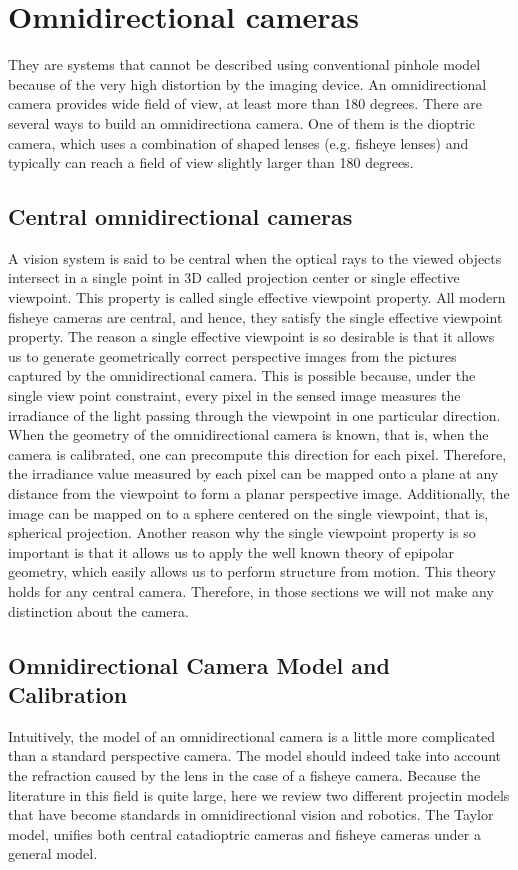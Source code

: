 \section{Omnidirectional cameras}
They are systems that cannot be described using conventional pinhole model because of the very high distortion by the imaging device.
An omnidirectional camera provides wide field of view, at least more than 180 degrees. There are several ways to build an omnidirectiona camera. One of them is the dioptric camera, which uses a combination of shaped lenses (e.g. fisheye lenses) and typically can reach a field of view slightly larger than 180 degrees.

\subsection{Central omnidirectional cameras}
A vision system is said to be central when the optical rays to the viewed objects intersect in a single point in 3D called projection center or single effective viewpoint. This property is called single effective viewpoint property.
All modern fisheye cameras are central, and hence, they satisfy the single effective viewpoint property. The reason a single effective viewpoint is so desirable is that it allows us to generate geometrically correct perspective images from the pictures captured by the omnidirectional camera. This is possible because, under the single view point constraint, every pixel in the sensed image measures the irradiance of the light passing through the viewpoint in one particular direction. When the geometry of the omnidirectional camera is known, that is, when the camera is calibrated, one can precompute this direction for each pixel. Therefore, the irradiance value measured by each pixel can be mapped onto a plane at any distance from the viewpoint to form a planar perspective image. Additionally, the image can be mapped on to a sphere centered on the single viewpoint, that is, spherical projection.
Another reason why the single viewpoint property is so important is that it allows us to apply the well known theory of epipolar geometry, which easily allows us to perform structure from motion. This theory holds for any central camera. Therefore, in those sections we will not make any distinction about the camera.

\subsection{Omnidirectional Camera Model and Calibration}
Intuitively, the model of an omnidirectional camera is a little more complicated than a standard perspective camera. The model should indeed take into account the refraction caused by the lens in the case of a fisheye camera. Because the literature in this field is quite large, here we review two different projectin models that have become standards in omnidirectional vision and robotics. The Taylor model, unifies both central catadioptric cameras and fisheye cameras under a general model.

